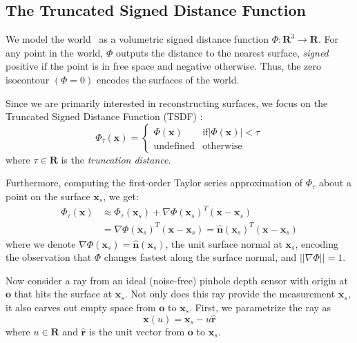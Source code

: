 \documentclass[10pt,twocolumn,letterpaper]{article}
\begin{document}
\subsection{The Truncated Signed Distance Function}
We model the world~\cite{Curless1996} as a volumetric signed distance function $\Phi: \mathbf{R}^3
\to \mathbf{R}$. For any point in the world, $\Phi$ 
outputs the distance to the nearest surface, \emph{signed} positive if the point
is in free space and negative otherwise. Thus, the zero isocontour $(\Phi = 0)$
encodes the surfaces of the world.

Since we are primarily interested in reconstructing surfaces, 
we focus on the Truncated Signed Distance Function (TSDF)
\cite{Curless1996}:
\begin{equation}
	\Phi_{\tau}(\mathbf{x}) = 
	\begin{cases}
		\Phi(\mathbf{x}) &  \text{if} |\Phi(\mathbf{x})| < \tau \\
		\text{undefined} & \text{otherwise}
	\end{cases}
\end{equation}
where $\tau \in \mathbf{R}$ is the \emph{truncation distance}.

Furthermore, computing the first-order Taylor series approximation of $\Phi_{\tau}$
about a point on the surface $\mathbf{x}_s$, we get:
\begin{align}
\label{eqn:atsdf}
\Phi_{\tau}(\mathbf{x}) &\approx \Phi_{\tau}(\mathbf{x}_s) + \nabla \Phi(\mathbf{x}_s)^{T} (\mathbf{x} - \mathbf{x}_s) \nonumber \\
 &= \nabla \Phi(\mathbf{x}_s)^{T} (\mathbf{x} - \mathbf{x}_s) = \mathbf{\hat{n}}(\mathbf{x}_s)^{T}(\mathbf{x} - \mathbf{x}_s)
\end{align}
where we denote $\nabla \Phi(\mathbf{x}_s) = \mathbf{\hat{n}}(\mathbf{x}_s)$, the unit surface normal at $\mathbf{x}_s$, 
encoding the observation that $\Phi$ changes fastest along the surface normal, and $||\nabla \Phi|| = 1$.

Now consider a ray from an ideal (noise-free) pinhole depth sensor with origin at $\mathbf{o}$ that 
hits the surface at $\mathbf{x}_s$. Not only does this ray provide the measurement $\mathbf{x}_s$,
it also carves out empty space from $\mathbf{o}$ to $\mathbf{x}_s$.  First, we parametrize the ray as 
\begin{equation}
\mathbf{x}(u) = \mathbf{x}_s - u\mathbf{\hat{r}}
\end{equation}
where $u \in \mathbf{R}$ and $\mathbf{\hat{r}}$ is the unit vector from $\mathbf{o}$ to $\mathbf{x}_s$.
\end{document}
